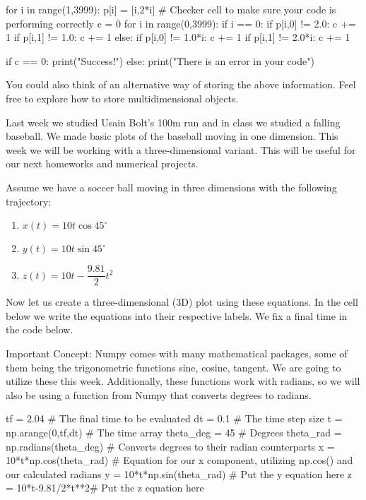 \documentclass[%
oneside,                 %
final,                   %
10pt]{article}
\begin{document}
\bpycod
for i in range(1,3999):
    p[i] = [i,2*i]
# Checker cell to make sure your code is performing correctly
c = 0
for i in range(0,3999):
    if i == 0:
        if p[i,0] != 2.0:
            c += 1
        if p[i,1] != 1.0:
            c += 1
    else:
        if p[i,0] != 1.0*i:
            c += 1
        if p[i,1] != 2.0*i:
            c += 1

if c == 0:
    print("Success!")
else:
    print("There is an error in your code")

\epycod


You could also think of an alternative way of storing the above information. Feel free to explore how to store
multidimensional objects. 

Last week we studied Usain Bolt's 100m run and in class we studied a falling baseball. We made basic plots of the baseball
moving in one dimension. This week we will be working with a three-dimensional variant. This will be useful for our next homeworks and numerical projects. 

Assume we have a soccer ball moving in three dimensions with the following trajectory:

\begin{enumerate}
\item $x(t) = 10t\cos{45^{\circ}} $

\item $y(t) = 10t\sin{45^{\circ}} $

\item $z(t) = 10t - \dfrac{9.81}{2}t^2$
\end{enumerate}

\noindent
Now let us create a three-dimensional (3D) plot using these equations. In the cell below
we write the equations into their respective labels. We fix a final time in the code below.

Important Concept: Numpy comes with many mathematical packages, some
of them being the trigonometric functions sine, cosine, tangent. We
are going to utilize these this week. Additionally, these functions
work with radians, so we will also be using a function from Numpy that
converts degrees to radians.










\bpycod
tf = 2.04  # The final time to be evaluated
dt = 0.1  # The time step size
t = np.arange(0,tf,dt) # The time array
theta_deg = 45 # Degrees
theta_rad = np.radians(theta_deg) # Converts degrees to their radian counterparts
x = 10*t*np.cos(theta_rad) # Equation for our x component, utilizing np.cos() and our calculated radians
y = 10*t*np.sin(theta_rad) # Put the y equation here
z = 10*t-9.81/2*t**2# Put the z equation here
\end{document}

